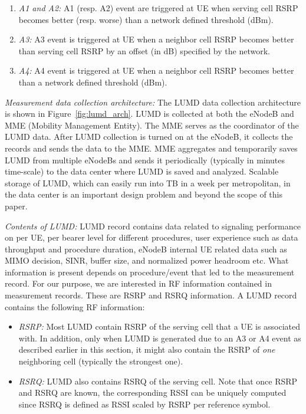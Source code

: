 \documentclass[conference, 10pt]{IEEEtran}
\begin{document}
\begin{enumerate}

\item {\em A1 and A2:} A1 (resp. A2) event are triggered at UE when serving cell RSRP
becomes better (resp. worse) than a network defined threshold (dBm).

\item {\em A3:} A3 event is triggered at UE when a neighbor cell RSRP becomes better
than serving cell RSRP by an offset (in dB) specified by the network.

\item {\em A4:} A4 event is triggered at UE when a neighbor cell RSRP becomes better
than a network defined threshold (dBm).


\end{enumerate}



{\em Measurement data collection architecture:} The LUMD data collection architecture
is shown in Figure~\ref{fig:lumd_arch}. LUMD is collected at both the eNodeB and MME
(Mobility Management Entity). The MME serves as the coordinator of the LUMD data.
After LUMD collection is turned on at the eNodeB, it collects the records and sends
the data to the MME. MME aggregates and temporarily saves LUMD from multiple
eNodeBs and sends it periodically (typically in minutes time-scale) to the data
center where LUMD is saved and analyzed. Scalable storage of LUMD, which can easily
run into TB in a week per metropolitan, in the data center is an important design
problem and beyond the scope of this paper.


{\em Contents of LUMD:} LUMD record contains data related to signaling performance on
per UE, per bearer level for different procedures, user experience such as data
throughput and procedure duration, eNodeB internal UE related data such as MIMO
decision, SINR, buffer size, and normalized power headroom etc.  What information is
present depends on procedure/event that led to the measurement record. For our
purpose, we are interested in RF information contained in measurement records. These
are RSRP and RSRQ information. A LUMD record contains the following RF information:

\begin{itemize}

\item {\em RSRP:} Most LUMD contain RSRP of the serving cell that a UE is associated
with. In addition, only when LUMD is generated due to an A3 or A4 event as described
earlier in this section, it might also contain the RSRP of {\em one} neighboring
cell (typically the strongest one).

\item {\em RSRQ:} LUMD also contains RSRQ of the serving cell. Note that once RSRP
and RSRQ are known, the corresponding RSSI can be uniquely computed since RSRQ is
defined as RSSI scaled by RSRP per reference symbol.

\end{itemize}
\end{document}
